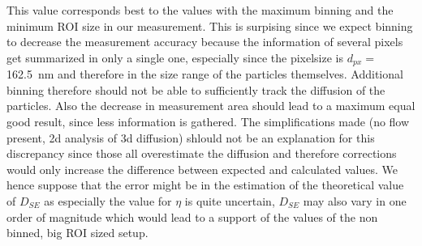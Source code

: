 This value corresponds best to the values with the maximum binning and the minimum ROI size in our measurement. This is surpising since we expect binning to decrease the measurement accuracy because the information of several pixels get summarized in only a single one, especially since the pixelsize is $d_{px} = $\SI{162.5}{\nano\meter} and therefore in the size range of the particles themselves. Additional binning therefore should not be able to sufficiently track the diffusion of the particles. Also the decrease in measurement area should lead to a maximum equal good result, since less information is gathered. The simplifications made (no flow present, 2d analysis of 3d diffusion) shlould not be an explanation for this discrepancy since those all overestimate the diffusion and therefore corrections would only increase the difference between expected and calculated values. We hence suppose that the error might be in the estimation of the theoretical value of $D_{SE}$ as especially the value for $\eta$ is quite uncertain, $D_{SE}$ may also vary in one order of magnitude which would lead to a support of the values of the non binned, big ROI sized setup.